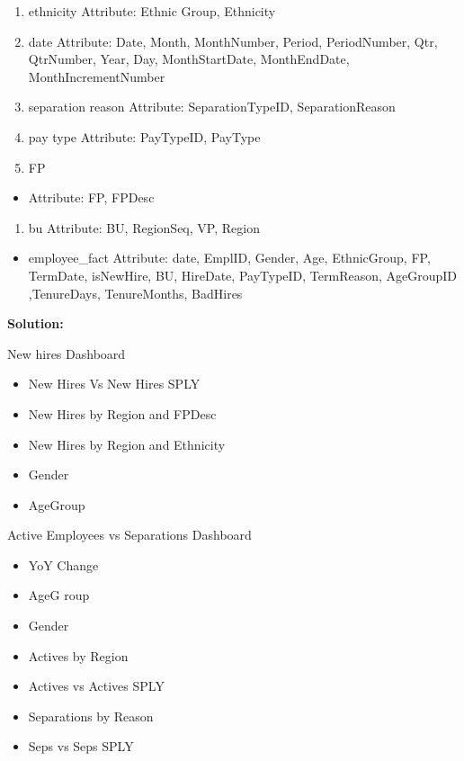 \documentclass[]{book}
\providecommand{\tightlist}{%
  \setlength{\itemsep}{0pt}\setlength{\parskip}{0pt}}
\begin{document}
\begin{enumerate}
\def\labelenumi{\arabic{enumi}.}
\setcounter{enumi}{2}
\tightlist
\item
  ethnicity Attribute: Ethnic Group, Ethnicity
\item
  date Attribute: Date, Month, MonthNumber, Period, PeriodNumber, Qtr,
  QtrNumber, Year, Day, MonthStartDate, MonthEndDate,
  MonthIncrementNumber
\item
  separation reason Attribute: SeparationTypeID, SeparationReason
\item
  pay type Attribute: PayTypeID, PayType
\item
  FP
\end{enumerate}

\begin{itemize}
\tightlist
\item
  Attribute: FP, FPDesc
\end{itemize}

\begin{enumerate}
\def\labelenumi{\arabic{enumi}.}
\setcounter{enumi}{7}
\tightlist
\item
  bu Attribute: BU, RegionSeq, VP, Region
\end{enumerate}

\begin{itemize}
\tightlist
\item
  employee\_fact Attribute: date, EmplID, Gender, Age, EthnicGroup, FP,
  TermDate, isNewHire, BU, HireDate, PayTypeID, TermReason, AgeGroupID
  ,TenureDays, TenureMonths, BadHires
\end{itemize}

\textbf{Solution: }

New hires Dashboard

\begin{itemize}
\tightlist
\item
  New Hires Vs New Hires SPLY
\item
  New Hires by Region and FPDesc
\item
  New Hires by Region and Ethnicity
\item
  Gender
\item
  AgeGroup
\end{itemize}

Active Employees vs Separations Dashboard

\begin{itemize}
\tightlist
\item
  YoY Change
\item
  AgeG roup
\item
  Gender
\item
  Actives by Region
\item
  Actives vs Actives SPLY
\item
  Separations by Reason
\item
  Seps vs Seps SPLY
\end{itemize}
\end{document}
